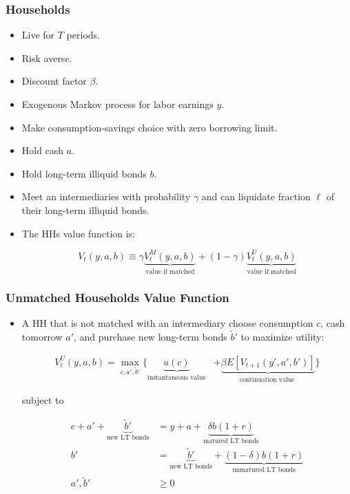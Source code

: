 \documentclass{beamer}
\begin{document}
\begin{frame}
\frametitle{Households}

\begin{itemize}[<+->]

\item Live for $T$ periods.
\item Risk averse.
\item Discount factor $\beta$.
\item Exogenous Markov process for labor earnings $y$.
\item Make consumption-savings choice with zero borrowing limit.
\item Hold cash $a$.
\item Hold long-term illiquid bonds $b$.
\item Meet an intermediaries with probability $\gamma$ and can liquidate fraction $\ell$ of their long-term illiquid bonds.
\item The HHs value function is:

$$
V_t(y, a, b) \equiv \gamma \underbrace{V^M_{t}(y, a, b)}_{\text{value if matched}} + (1-\gamma) \underbrace{V^U_{t}(y, a, b)}_{\text{value if matched}}
$$

\end{itemize}

\end{frame}






\begin{frame}
\frametitle{Unmatched Households Value Function}

\begin{itemize}[<+->]

\item A HH that is not matched with an intermediary choose consumption $c$, cash tomorrow $a'$, and purchase new long-term bonds $\tilde{b}'$ to maximize utility:

\begin{align*}
V_{t}^U(y, a, b) 
= \max_{c, a', \tilde{b}'} 
\Bigg\{ 
\underbrace{u(c)}_{\text{instantaneous value}} 
&+ \underbrace{\beta E[V_{t+1}(y', a', b')]}_{\text{continuation value }} \Bigg\}
\end{align*}

subject to

\begin{align*}
c + a' + \underbrace{\tilde{b}'}_{\text{new LT bonds}} &= y + a + \underbrace{\delta b (1 + r)}_{\text{matured LT bonds}} \\ 
b' &= \underbrace{\tilde{b}'}_{\text{new LT bonds}} + \underbrace{(1-\delta)b(1+r)}_{\text{unmatured LT bonds}}\\
a', \tilde{b}' &\ge 0
\end{align*}

\end{itemize}

\end{frame}
\end{document}
